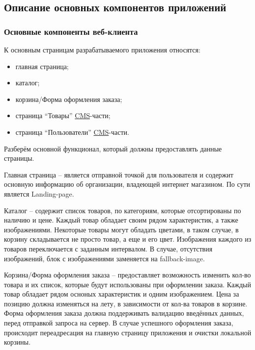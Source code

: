 \subsection{Описание основных компонентов приложений}\label{subsec:2-common-components}\indent


\subsubsection{Основные компоненты веб-клиента}

К основным страницам разрабатываемого приложения относятся:

\begin{itemize}
    \item главная страница;
    \item каталог;
    \item корзина/Форма оформления заказа;
    \item страница “Товары” \hyperlink{gloss:cms}{CMS}-части;
    \item страница “Пользователи” \hyperlink{gloss:cms}{CMS}-части.
\end{itemize}

Разберём основной функционал, который должны предоставлять данные страницы.

Главная страница – является отправной точкой для пользователя и содержит основную информацию об организации, владеющей интернет магазином.
По сути является Landing-page.

Каталог – содержит список товаров, по категориям, которые отсортированы по наличию и цене.
Каждый товар обладает своим рядом характеристик, а также изображениями.
Некоторые товары могут обладать цветами, в таком случае, в корзину складывается не просто товар, а еще и его цвет.
Изображения каждого из товаров переключается с заданным интервалом.
В случае, отсутствия изображений, блок с изображениями заменяется на fallback-image.

Корзина/Форма оформления заказа – предоставляет возможность изменить кол-во товара и их список, которые будут использованы при оформлении заказа.
Каждый товар обладает рядом осноных характеристик и одним изображением.
Цена за позицию должна изменяться на лету, в зависимости от кол-ва товаров в корзине.
Форма оформления заказа должна поддерживать валидацию введённых данных, перед отправкой запроса на сервер.
В случае успешного оформления заказа, происходит переадресация на главную страницу приложения и очистки локальной корзины.


